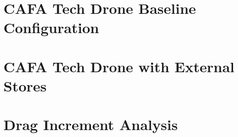 \section{CAFA Tech Drone Baseline Configuration}
\section{CAFA Tech Drone with External Stores}
\section{Drag Increment Analysis}
